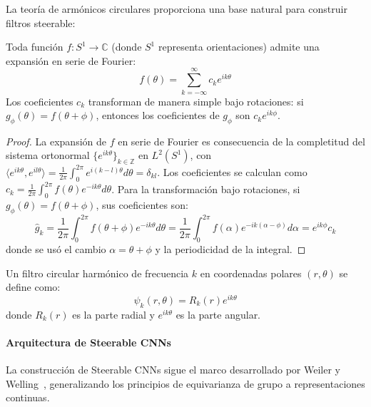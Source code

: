 La teoría de armónicos circulares proporciona una base natural para construir filtros steerable:

\begin{theorem}
Toda función $f: S^1 \to \mathbb{C}$ (donde $S^1$ representa orientaciones) admite una expansión en serie de Fourier:
\begin{equation}
f(\theta) = \sum_{k=-\infty}^{\infty} c_k e^{ik\theta}
\end{equation}
Los coeficientes $c_k$ transforman de manera simple bajo rotaciones: si $g_\phi(\theta) = f(\theta + \phi)$, entonces los coeficientes de $g_\phi$ son $c_k e^{ik\phi}$.
\end{theorem}

\begin{proof}
La expansión de $f$ en serie de Fourier es consecuencia de la completitud del sistema ortonormal $\{e^{ik\theta}\}_{k \in \mathbb{Z}}$ en $L^2(S^1)$, con $\langle e^{ik\theta}, e^{il\theta} \rangle = \frac{1}{2\pi}\int_0^{2\pi} e^{i(k-l)\theta} d\theta = \delta_{kl}$. Los coeficientes se calculan como $c_k = \frac{1}{2\pi}\int_0^{2\pi} f(\theta) e^{-ik\theta} d\theta$. Para la transformación bajo rotaciones, si $g_\phi(\theta) = f(\theta + \phi)$, sus coeficientes son:
\[
\hat{g}_k = \frac{1}{2\pi}\int_0^{2\pi} f(\theta + \phi) e^{-ik\theta} d\theta = \frac{1}{2\pi}\int_0^{2\pi} f(\alpha) e^{-ik(\alpha - \phi)} d\alpha = e^{ik\phi} c_k
\]
donde se usó el cambio $\alpha = \theta + \phi$ y la periodicidad de la integral.
\end{proof}

\begin{definition}
Un filtro circular harmónico de frecuencia $k$ en coordenadas polares $(r, \theta)$ se define como:
\begin{equation}
\psi_k(r, \theta) = R_k(r) e^{ik\theta}
\end{equation}
donde $R_k(r)$ es la parte radial y $e^{ik\theta}$ es la parte angular.
\end{definition}

\paragraph{Arquitectura de Steerable CNNs}

La construcción de Steerable CNNs sigue el marco desarrollado por Weiler y Welling~\citep{weiler2019general}, generalizando los principios de equivarianza de grupo a representaciones continuas.

